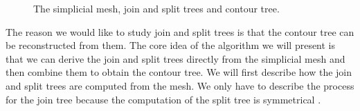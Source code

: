 \begin{figure}[h]
    \caption{The simplicial mesh, join and split trees and contour tree.}%
    \label{fig:mesh-join-split-contour}%
\end{figure}

The reason we would like to study join and split trees is that the contour tree can be reconstructed from them. The core idea of the algorithm we will present is that we can derive the join and split trees directly from the simplicial mesh and then combine them to obtain the contour tree. We will first describe how the join and split trees are computed from the mesh. We only have to describe the process for the join tree because the computation of the split tree is symmetrical \cite{ct-big-paper}.

